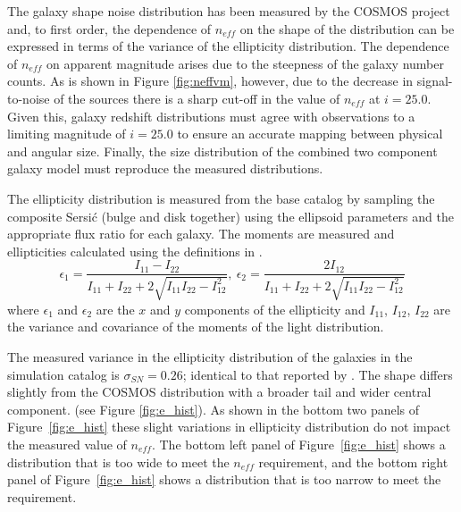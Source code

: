 \documentclass[11pt]{article}
\begin{document}
The galaxy shape noise distribution has been measured by the COSMOS
project \citep{cosmos} and, to first order, the dependence of
$n_{eff}$ on the shape of the distribution can be expressed in terms
of the variance of the ellipticity distribution. The dependence of
$n_{eff}$ on apparent magnitude arises due to the steepness of the
galaxy number counts. As is shown in Figure \ref{fig:neffvm}, however,
due to the decrease in signal-to-noise of the sources there is a sharp
cut-off in the value of $n_{eff}$ at $i=25.0$.  Given this, galaxy
redshift distributions must agree with observations to a limiting
magnitude of $i=25.0$ to ensure an accurate mapping between physical
and angular size.  Finally, the size distribution of the combined two
component galaxy model must reproduce the measured distributions.

The ellipticity distribution is measured from the base catalog by
sampling the composite Sersi{\'c} (bulge and disk together) using the
ellipsoid parameters and the appropriate flux ratio for each galaxy.
The moments are measured and ellipticities calculated using the
definitions in \citet{chang}.
\begin{equation}
\epsilon_1 = \frac{I_{11}-I_{22}}{I_{11}+I_{22}+2\sqrt{I_{11}I_{22} - I^{2}_{12}}},~
\epsilon_2 = \frac{2I_{12}}{I_{11}+I_{22}+2\sqrt{I_{11}I_{22} - I^{2}_{12}}}
\end{equation}
where $\epsilon_1$ and $\epsilon_2$ are the $x$ and $y$ components of
the ellipticity and $I_{11}$, $I_{12}$, $I_{22}$ are the variance and
covariance of the moments of the light distribution.

The measured variance in the ellipticity distribution of the galaxies
in the simulation catalog is $\sigma_{SN} = 0.26$; identical to that
reported by \citet{chang}. The shape differs slightly from the COSMOS
distribution with a broader tail and wider central component. (see
Figure \ref{fig:e_hist}).  As shown in the bottom two panels of
Figure~\ref{fig:e_hist} these slight variations in ellipticity
distribution do not impact the measured value of $n_{eff}$.  The
bottom left panel of Figure~\ref{fig:e_hist} shows a distribution that
is too wide to meet the $n_{eff}$ requirement, and the bottom right
panel of Figure~\ref{fig:e_hist} shows a distribution that is too
narrow to meet the requirement.
\end{document}
